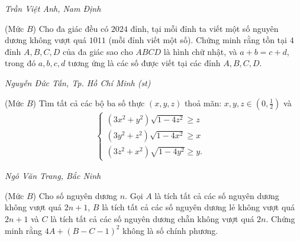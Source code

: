 \begin{multicols}{2}
\begin{figure}[H]
		\vspace*{-15pt}
	\end{figure}
	\begin{flushright}
		\textit{Trần Việt Anh, Nam Định}
	\end{flushright}
	{}
	(Mức $B$) Cho đa giác đều có $2024$ đỉnh, tại mỗi đỉnh ta viết một số nguyên dương không vượt quá $1011$ (mỗi đỉnh viết một số). Chứng minh rằng tồn tại $4$ đỉnh $A,B,C,D$ của đa giác sao cho $ABCD$ là hình chữ nhật, và  $a+b=c+d$, trong đó $a,b,c,d$ tương ứng là các số được viết tại các đỉnh $A,B,C,D$. 
	\begin{flushright}
		\textit{Nguyễn Đức Tấn, Tp. Hồ Chí Minh (st)}
	\end{flushright}
	{}
	(Mức $B$) Tìm tất cả các bộ ba số thực $(x,y,z)$ thoả mãn: $x,y,z\in\left(0,\frac12\right)$ và
	\begin{align*}
		\begin{cases}
			\left(3x^2+y^2\right)\sqrt{1-4z^2}\ge z&\\
			\left(3y^2+z^2\right)\sqrt{1-4x^2}\ge x&\\
			\left(3z^2+x^2\right)\sqrt{1-4y^2}\ge y.
		\end{cases}
	\end{align*}
	\begin{flushright}
		\textit{Ngô Văn Trang, Bắc Ninh}
	\end{flushright}
	{}
	(Mức $B$) Cho số nguyên dương $n$. Gọi $A$ là tích tất cả các số nguyên dương không vượt quá $2n+1$, $B$ là tích tất cả các số nguyên dương lẻ không vượt quá $2n+1$ và $C$ là tích tất cả các số nguyên dương chẵn không vượt quá $2n$. Chứng minh rằng $4A+(B-C-1)^2$ không là số chính phương.

\end{multicols}
